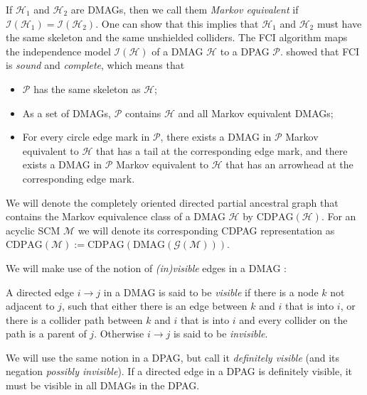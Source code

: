 \documentclass[twoside,11pt]{article}
\newcommand\C[1]{\mathcal{#1}}
\newcommand{\ttt}{\relbar\!\!\!\relbar}
\newcommand{\ttc}{\relbar\!\!\!\relbar\mkern-9mu\circ\,}
\newcommand{\CPAG}{\mathrm{CPAG}}
\newcommand{\DMAG}{\mathrm{DMAG}}
\newcommand{\CDPAG}{\mathrm{CDPAG}}
\begin{document}
If $\C{H}_1$ and $\C{H}_2$ are DMAGs, then we call them \emph{Markov equivalent} if $\C{I}(\C{H}_1) = \C{I}(\C{H}_2)$. 
One can show that this implies that $\C{H}_1$ and $\C{H}_2$ must have the same skeleton and the same unshielded colliders.
The FCI algorithm maps the independence model $\C{I}(\C{H})$ of a DMAG $\C{H}$ to a DPAG $\C{P}$. 
\citet{Zhang2008_AI} showed that FCI is \emph{sound} and \emph{complete}, which means that
\begin{itemize}
  \item $\C{P}$ has the same skeleton as $\C{H}$;
  \item As a set of DMAGs, $\C{P}$ contains $\C{H}$ and all Markov equivalent DMAGs;
  \item For every circle edge mark in $\C{P}$, there exists a DMAG in $\C{P}$ Markov equivalent to $\C{H}$ that has a tail at the corresponding edge mark, and there exists a DMAG in $\C{P}$ Markov equivalent to $\C{H}$ that has an arrowhead at the corresponding edge mark.
\end{itemize}
We will denote the completely oriented directed partial ancestral graph that contains the Markov equivalence class of a DMAG $\C{H}$ by $\CDPAG(\C{H})$.
For an acyclic SCM $\C{M}$ we will denote its corresponding CDPAG representation as $\CDPAG(\C{M}) := \CDPAG(\DMAG(\C{G}(\C{M})))$. 

We will make use of the notion of \emph{(in)visible} edges in a DMAG \citep{Zhang2008_JMLR}:
\begin{definition}
A directed edge $i \to j$ in a DMAG is said to be \emph{visible} if there is a node
$k$ not adjacent to $j$, such that either there is an edge between $k$ and $i$ that is into $i$, or there is a
collider path between $k$ and $i$ that is into $i$ and every collider on the path is a parent of $j$. Otherwise
$i \to j$ is said to be \emph{invisible}.
\end{definition}
We will use the same notion in a DPAG, but call it \emph{definitely visible} (and its negation \emph{possibly invisible}).
If a directed edge in a DPAG is definitely visible, it must be visible in all DMAGs in the DPAG.
\end{document}
